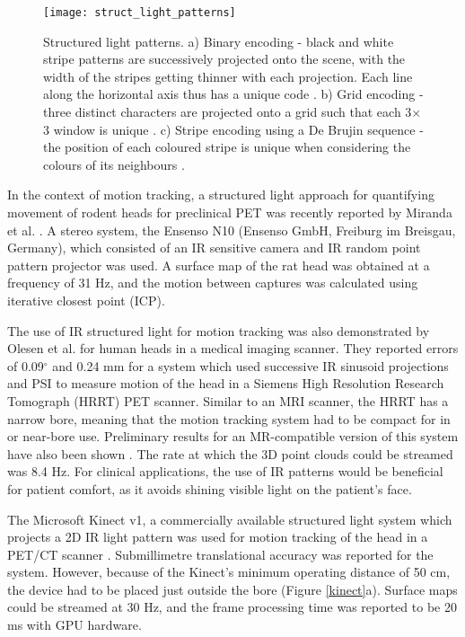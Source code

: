 \documentclass[class=article, crop=false]{standalone}
\begin{document}
\begin{figure}
	\centering
	\texttt{[image: struct\_light\_patterns]}
	\caption{Structured light patterns. a) Binary encoding - black and white stripe patterns are successively projected onto the scene, with the width of the stripes getting thinner with each projection. Each line along the horizontal axis thus has a unique code \parencite{Geng2011}. b) Grid encoding - three distinct characters are projected onto a grid such that each 3$\times$3 window is unique \parencite{Albitar2006}. c) Stripe encoding using a De Brujin sequence - the position of each coloured stripe is unique when considering the colours of its neighbours \parencite{Zhang2002}. }
	\label{struct_patterns}
\end{figure}

\par
In the context of motion tracking, a structured light approach for quantifying movement of rodent heads for preclinical PET was recently reported by Miranda et al. \parencite*{Miranda2017}. A stereo system, the Ensenso N10 (Ensenso GmbH, Freiburg im Breisgau, Germany), which consisted of an IR sensitive camera and IR random point pattern projector was used. A surface map of the rat head was obtained at a frequency of 31 Hz, and the motion between captures was calculated using iterative closest point (ICP).
\par 
The use of IR structured light for motion tracking was also demonstrated by Olesen et al. \parencite*{Olesen2012} for human heads in a medical imaging scanner. They reported errors of 0.09$^{\circ}$ and 0.24 mm for a system which used successive IR sinusoid projections and PSI to measure motion of the head in a Siemens High Resolution Research Tomograph (HRRT) PET scanner. Similar to an MRI scanner, the HRRT has a narrow bore, meaning that the motion tracking system had to be compact for in or near-bore use. Preliminary results for an MR-compatible version of this system have also been shown \parencite{Olesen2015a}. The rate at which the 3D point clouds could be streamed was 8.4 Hz. For clinical applications, the use of IR patterns would be beneficial for patient comfort, as it avoids shining visible light on the patient's face.
\par
The Microsoft Kinect v1, a commercially available structured light system which projects a 2D IR light pattern was used for motion tracking of the head in a PET/CT scanner \parencite{Noonan2012}. Submillimetre translational accuracy was reported for the system. However, because of the Kinect's minimum operating distance of 50 cm, the device had to be placed just outside the bore (Figure \ref{kinect}a). Surface maps could be streamed at 30 Hz, and the frame processing time was reported to be 20 ms with GPU hardware.
\end{document}
